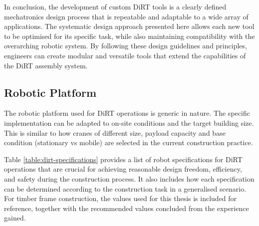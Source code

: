 In conclusion, the development of custom DiRT tools is a clearly defined mechatronics design process that is repeatable and adaptable to a wide array of applications. The systematic design approach presented here allows each new tool to be optimised for its specific task, while also maintaining compatibility with the overarching robotic system. By following these design guidelines and principles, engineers can create modular and versatile tools that extend the capabilities of the DiRT assembly system. 

\subsection{Robotic Platform}
\label{subsection:discussion-robotic-platform}

The robotic platform used for DiRT operations is generic in nature. The specific implementation can be adapted to on-site conditions and the target building size. This is similar to how cranes of different size, payload capacity and base condition (stationary vs mobile) are selected in the current construction practice. 

Table \ref{table:dirt-specifications} provides a list of robot specifications for DiRT operations that are crucial for achieving reasonable design freedom, efficiency, and safety during the construction process. It also includes how each specification can be determined according to the construction task in a generalised scenario. For timber frame construction, the values used for this thesis is included for reference, together with the recommended values concluded from the experience gained.

